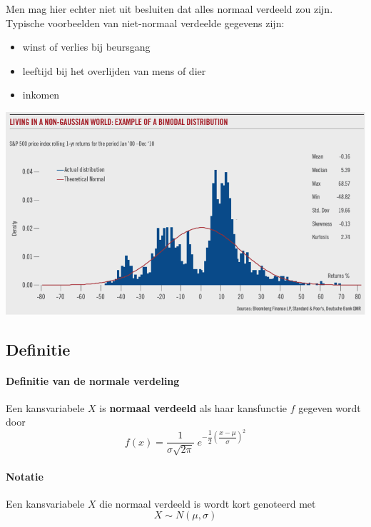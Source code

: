 \documentclass[12pt,twoside]{article}
\begin{document}
\begin{minipage}{0.35\textwidth}
Men mag hier echter niet uit besluiten dat alles normaal verdeeld zou zijn. Typische voorbeelden van niet-normaal verdeelde gegevens zijn:

\begin{itemize}
  \item winst of verlies bij beursgang
  \item leeftijd bij het overlijden van mens of dier
  \item inkomen
\end{itemize}
\end{minipage}
\begin{minipage}{0.65\textwidth}
  \begin{center}
    \includegraphics[width=\textwidth]{non-normal}
  \end{center}
\end{minipage}

\subsection{Definitie}

\paragraph*{Definitie van de normale verdeling}
\begin{mdframed}
Een kansvariabele $X$ is {\bf normaal verdeeld} als haar kansfunctie $f$ gegeven wordt door
$$f(x)=\dfrac{1}{\sigma{\sqrt{2\pi}}}\;e^{-\dfrac{1}{2}\left(\dfrac{x-\mu}{\sigma}\right)^2}$$
\end{mdframed}

\paragraph*{Notatie}
Een kansvariabele $X$ die normaal verdeeld is wordt kort genoteerd met
$$X\sim N(\mu, \sigma)$$
\end{document}
